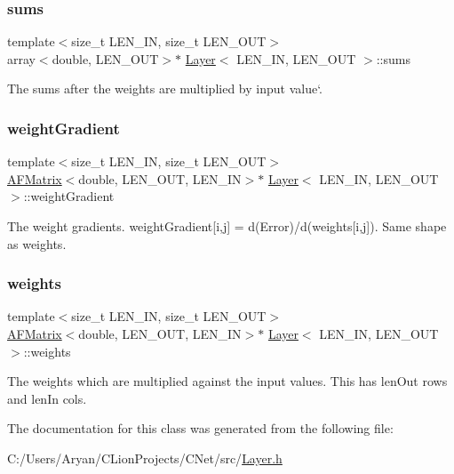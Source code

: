 \mbox{\label{class_layer_aa0a3384dec407f34bf9d93994fc6613f}} 
\subsubsection{\texorpdfstring{sums}{sums}}
{\footnotesize\ttfamily template$<$size\+\_\+t L\+E\+N\+\_\+\+IN, size\+\_\+t L\+E\+N\+\_\+\+O\+UT$>$ \\
array$<$double, L\+E\+N\+\_\+\+O\+UT$>$$\ast$ \hyperlink{class_layer}{Layer}$<$ L\+E\+N\+\_\+\+IN, L\+E\+N\+\_\+\+O\+UT $>$\+::sums}



The sums after the weights are multiplied by input value`. 

\mbox{\label{class_layer_ab4afc6b6fdda2b5fd21621f40be776fd}} 
\subsubsection{\texorpdfstring{weight\+Gradient}{weightGradient}}
{\footnotesize\ttfamily template$<$size\+\_\+t L\+E\+N\+\_\+\+IN, size\+\_\+t L\+E\+N\+\_\+\+O\+UT$>$ \\
\hyperlink{class_a_f_matrix}{A\+F\+Matrix}$<$double, L\+E\+N\+\_\+\+O\+UT, L\+E\+N\+\_\+\+IN$>$$\ast$ \hyperlink{class_layer}{Layer}$<$ L\+E\+N\+\_\+\+IN, L\+E\+N\+\_\+\+O\+UT $>$\+::weight\+Gradient}



The weight gradients. {\ttfamily weight\+Gradient\mbox{[}i,j\mbox{]} = d(\+Error)/d(weights\mbox{[}i,j\mbox{]})}. Same shape as {\ttfamily weights}. 

\mbox{\label{class_layer_aa362ee5edaf5b0fe8d5d7c4674ded7a1}} 
\subsubsection{\texorpdfstring{weights}{weights}}
{\footnotesize\ttfamily template$<$size\+\_\+t L\+E\+N\+\_\+\+IN, size\+\_\+t L\+E\+N\+\_\+\+O\+UT$>$ \\
\hyperlink{class_a_f_matrix}{A\+F\+Matrix}$<$double, L\+E\+N\+\_\+\+O\+UT, L\+E\+N\+\_\+\+IN$>$$\ast$ \hyperlink{class_layer}{Layer}$<$ L\+E\+N\+\_\+\+IN, L\+E\+N\+\_\+\+O\+UT $>$\+::weights}



The weights which are multiplied against the input values. This has {\ttfamily len\+Out} rows and {\ttfamily len\+In} cols. 



The documentation for this class was generated from the following file\+:\begin{DoxyCompactItemize}
\item 
C\+:/\+Users/\+Aryan/\+C\+Lion\+Projects/\+C\+Net/src/\hyperlink{_layer_8h}{Layer.\+h}\end{DoxyCompactItemize}
